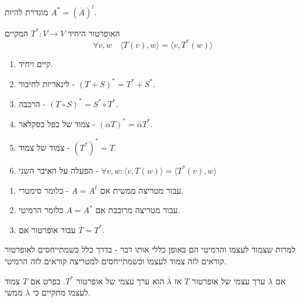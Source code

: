 \documentclass{tstextbook}
\begin{document}
\begin{definition}
מוגדרת להיות \(A^* = (\overline{A})^t\).

\end{definition}
\begin{definition}
האופרטור היחיד \(T^*:V\rightarrow V\) המקיים 
$$\forall v,w \quad \langle T(v), w\rangle = \langle v, T^*(w)\rangle$$

\end{definition}
\begin{proposition}
  \begin{enumerate}
    \item קיים ויחיד. 


    \item לינאריות לחיבור - \((T+S)^* = T^* + S^*\). 


    \item הרכבה - \((T\circ S)^* = S^* \circ T^*\). 


    \item צמוד של כפל בסקלאר - \((\alpha T)^* = \overline{\alpha} T^*\). 


    \item צמוד של צמוד - \((T^{*})^{*}=T\). 


    \item הפעלה על האיבר השני - \(\forall v,w: \langle v, T(w) \rangle = \langle T^*(v), w \rangle\)


  \end{enumerate}
\end{proposition}
\begin{definition}
  \begin{enumerate}
    \item עבור מטריצה ממשית אם \(A=A^{t}\) - כלומר סימטרי. 


    \item עבור מטריצה מרוכבת אם \(A=A^{*}\) כלומר הרמיטי. 


    \item עבור אופרטור אם \(T=T^{*}\). 


  \end{enumerate}
\end{definition}
\begin{remark}
למרות שצמוד לעצמו והרמיטי הם באופן כללי אותו דבר - בדרך כלל כשמתייחסים לאופרטור קוראים לזה צמוד לעצמו וכשמתייחסים למטריצה קוראים לזה הרמיטי.

\end{remark}
\begin{proposition}
אם \(\lambda\) ערך עצמי של אופרטור \(T\) אז \(\overline{\lambda}\) הוא ערך עצמי של אופרטור \(T^{*}\). בפרט אם \(T\) צמוד לעצמו מתקיים כי \(\lambda\) ממשי.

\end{proposition}
\end{document}
